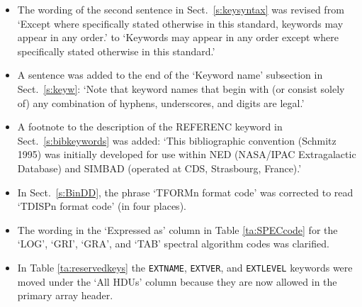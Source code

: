 \documentclass[onecolumn]{aa}
\begin{document}
\begin{enumerate}
\begin{itemize}
\item The wording of the second sentence in Sect.\ \ref{s:keysyntax}
 was revised from
 `Except where specifically stated otherwise in this standard,
keywords may appear in any order.' to `Keywords may appear in any order
except where specifically stated otherwise in this standard.'

\item A sentence was added to the end of the `Keyword name' subsection 
in Sect.\ \ref{s:keyw}:
`Note that keyword names that begin with (or consist solely of) any
combination  of hyphens, underscores, and digits are legal.'

\item A footnote to the description of the REFERENC keyword
in Sect.\ \ref{s:bibkeywords} was added: `This bibliographic convention (Schmitz
1995) was initially developed for use within NED (NASA/IPAC 
Extragalactic Database) and SIMBAD (operated at CDS, Strasbourg,
France).'

\item In Sect.\  \ref{s:BinDD}, the phrase `TFORMn format code' was corrected
to read `TDISPn format code' (in four places).

\item  The wording in the `Expressed as' column in 
Table \ref{ta:SPECcode} for the `LOG', `GRI', `GRA', and `TAB'
spectral algorithm codes was clarified.

\item In Table \ref{ta:reservedkeys} the {\tt EXTNAME}, {\tt EXTVER}, and 
{\tt EXTLEVEL} keywords were moved under the `All HDUs' column because
they are now allowed in the primary array header.

\end{itemize}

\end{enumerate}
\end{document}
